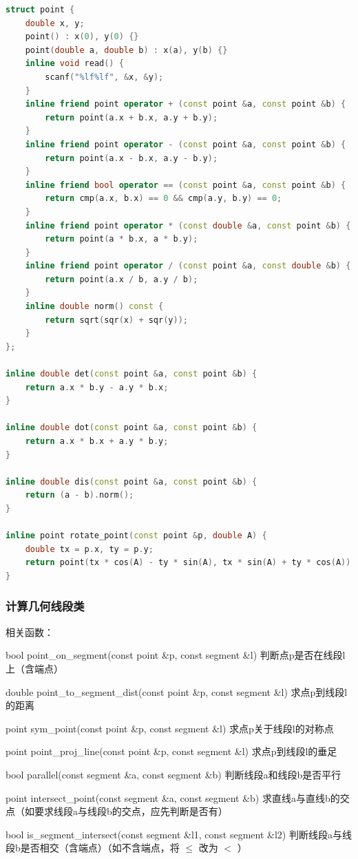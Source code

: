 \documentclass{article}
\begin{document}
\begin{lstlisting}[language=C++]
struct point {
	double x, y;
	point() : x(0), y(0) {}
	point(double a, double b) : x(a), y(b) {}
	inline void read() {
		scanf("%lf%lf", &x, &y);
	}
	inline friend point operator + (const point &a, const point &b) {
		return point(a.x + b.x, a.y + b.y);
	}
	inline friend point operator - (const point &a, const point &b) {
		return point(a.x - b.x, a.y - b.y);
	}
	inline friend bool operator == (const point &a, const point &b) {
		return cmp(a.x, b.x) == 0 && cmp(a.y, b.y) == 0;
	}
	inline friend point operator * (const double &a, const point &b) {
		return point(a * b.x, a * b.y);
	}
	inline friend point operator / (const point &a, const double &b) {
		return point(a.x / b, a.y / b);
	}
	inline double norm() const {
		return sqrt(sqr(x) + sqr(y));
	}
};

inline double det(const point &a, const point &b) {
	return a.x * b.y - a.y * b.x;
}

inline double dot(const point &a, const point &b) {
	return a.x * b.x + a.y * b.y;
}

inline double dis(const point &a, const point &b) {
	return (a - b).norm();
}

inline point rotate_point(const point &p, double A) {
	double tx = p.x, ty = p.y;
	return point(tx * cos(A) - ty * sin(A), tx * sin(A) + ty * cos(A));
}
\end{lstlisting}

\subsubsection{计算几何线段类}

相关函数：

bool point\_on\_segment(const point \&p, const segment \&l) 判断点p是否在线段l上（含端点）

double point\_to\_segment\_dist(const point \&p, const segment \&l) 求点p到线段l的距离

point sym\_point(const point \&p, const segment \&l) 求点p关于线段l的对称点

point point\_proj\_line(const point \&p, const segment \&l) 求点p到线段l的垂足

bool parallel(const segment \&a, const segment \&b) 判断线段a和线段b是否平行

point intersect\_point(const segment \&a, const segment \&b) 求直线a与直线b的交点（如要求线段a与线段b的交点，应先判断是否有）

bool is\_segment\_intersect(const segment \&l1, const segment \&l2) 判断线段a与线段b是否相交（含端点）（如不含端点，将 $\leq$ 改为 $<$ ）
\end{document}
